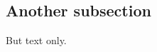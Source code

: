 \begin{spacing}{2}
    \subsection{Another subsection}
    
    \par
    But text only. 
    
\end{spacing}
